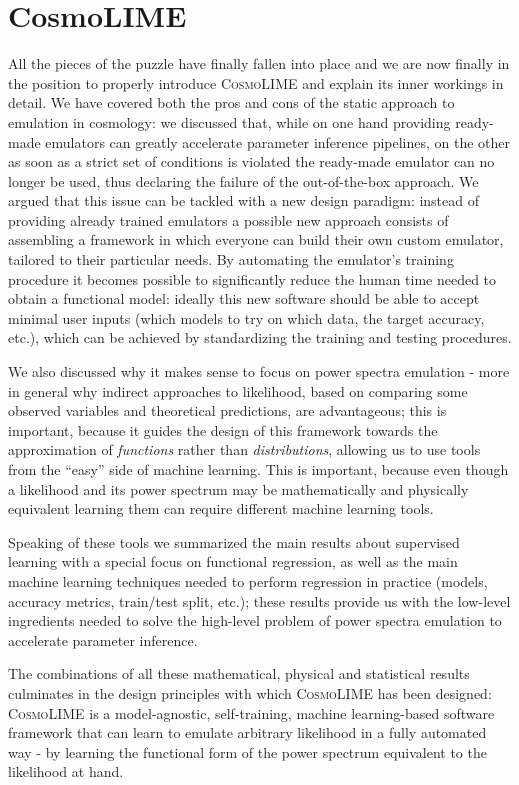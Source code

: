 \chapter{CosmoLIME}
All the pieces of the puzzle have finally fallen into place and we are now finally in the position to properly introduce \textsc{CosmoLIME} and explain its inner workings in detail. We have covered both the pros and cons of the static approach to emulation in cosmology: we discussed that, while on one hand providing ready-made emulators can greatly accelerate parameter inference pipelines, on the other as soon as a strict set of conditions is violated the ready-made emulator can no longer be used, thus declaring the failure of the out-of-the-box approach. We argued that this issue can be tackled with a new design paradigm: instead of providing already trained emulators a possible new approach consists of assembling a framework in which everyone can build their own custom emulator, tailored to their particular needs. By automating the emulator's training procedure it becomes possible to significantly reduce the human time needed to obtain a functional model: ideally this new software should be able to accept minimal user inputs (which models to try on which data, the target accuracy, etc.), which can be achieved by standardizing the training and testing procedures.

We also discussed why it makes sense to focus on power spectra emulation - more in general why indirect approaches to likelihood, based on comparing some observed variables and theoretical predictions, are advantageous; this is important, because it guides the design of this framework towards the approximation of \emph{functions} rather than \emph{distributions}, allowing us to use tools from the ``easy'' side of machine learning. This is important, because even though a likelihood and its power spectrum may be mathematically and physically equivalent learning them can require different machine learning tools.

Speaking of these tools we summarized the main results about supervised learning with a special focus on functional regression, as well as the main machine learning techniques needed to perform regression in practice (models, accuracy metrics, train/test split, etc.); these results provide us with the low-level ingredients needed to solve the high-level problem of power spectra emulation to accelerate parameter inference.

The combinations of all these mathematical, physical and statistical results culminates in the design principles with which \textsc{CosmoLIME} has been designed: \textsc{CosmoLIME} is a model-agnostic, self-training, machine learning-based software framework that can learn to emulate arbitrary likelihood in a fully automated way - by learning the functional form of the power spectrum equivalent to the likelihood at hand.

